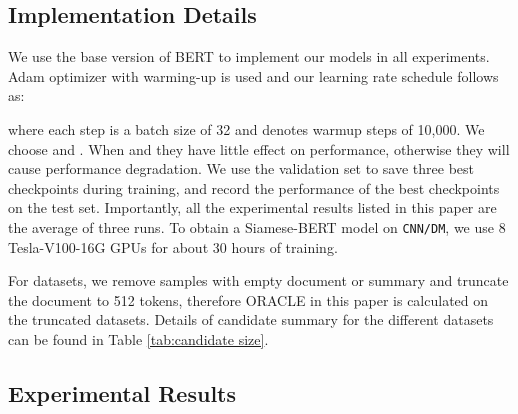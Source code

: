 \documentclass[11pt,a4paper]{article}
\begin{document}
\subsection{Implementation Details}
We use the base version of BERT to implement our models in all experiments. Adam optimizer \cite{kingma2014adam} with warming-up is used and our learning rate schedule follows \citet{vaswani2017attention} as:

where each step is a batch size of 32 and  denotes warmup steps of 10,000. We choose  and . When  and  they have little effect on performance, otherwise they will cause performance degradation. We use the validation set to save three best checkpoints during training, and record the performance of the best checkpoints on the test set. Importantly, all the experimental results listed in this paper are the average of three runs. To obtain a Siamese-BERT model on \texttt{CNN/DM}, we use 8 Tesla-V100-16G GPUs for about 30 hours of training.

For datasets, we remove samples with empty document or summary and truncate the document to 512 tokens, therefore ORACLE in this paper is calculated on the truncated datasets. Details of candidate summary for the different datasets can be found in Table \ref{tab:candidate size}.


































\subsection{Experimental Results}
\end{document}
